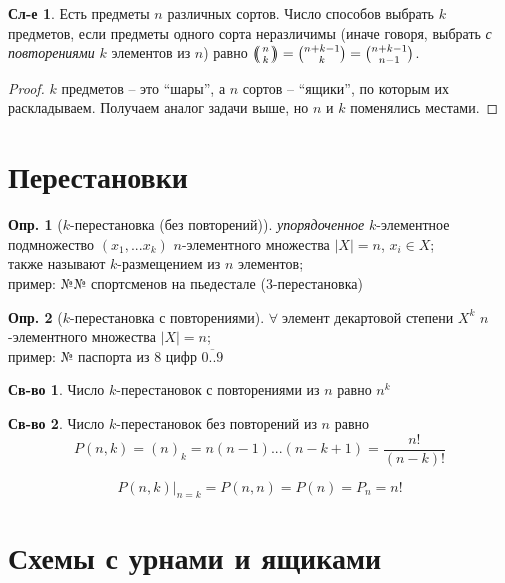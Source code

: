 \documentclass[a4paper,12pt]{article}
\numberwithin{figure}{section}
\theoremstyle{definition}
\newtheorem{definition}{Опр.}[section]
\newtheorem*{property}{Св-во}  %
\theoremstyle{definition}
\newtheorem*{corollary}{Сл-е} %
\def\iiany{$\forall\;$}
\begin{document}
\begin{corollary}
	Есть предметы $n$ различных сортов. Число способов выбрать $k$ предметов, если предметы одного сорта неразличимы (иначе говоря, выбрать \textit{с повторениями} $k$ элементов из $n$) равно $\mbinom{n}{k} = \binom{n+k-1}{k} = \binom{n+k-1}{n-1}$.
\end{corollary}
\begin{proof}
	$k$ предметов -- это ``шары'', а $n$ сортов -- ``ящики'', по которым их раскладываем. Получаем аналог задачи выше, но $n$ и $k$ поменялись местами.
\end{proof}



\section{Перестановки}


\begin{definition}[$k$-перестановка (без повторений)]
	\textit{упорядоченное} $k$-элементное подмножество $(x_1,...x_k)$ $n$-элементного множества $|X|=n$, $x_i \in X$; \\
	также называют $k$-размещением из $n$ элементов; \\
	пример: №№ спортсменов на пьедестале (3-перестановка)
\end{definition}

\begin{definition}[$k$-перестановка с повторениями]
	\iiany элемент декартовой степени $X^k$ $n$-элементного множества $|X|=n$; \\
	пример: № паспорта из 8 цифр $\overline{0..9}$
\end{definition}

\begin{property}
	Число $k$-перестановок с повторениями из $n$ равно $n^k$
\end{property}

\begin{property}
	Число $k$-перестановок без повторений из $n$ равно
	\[ P(n,k) = (n)_k = n(n-1)...(n-k+1) = \frac{n!}{(n-k)!} \]
\end{property}

\[ P(n,k) \Bigr|_{n=k} = P(n,n) = P(n) = P_n = n! \]



\section{Схемы с урнами и ящиками}
\end{document}
